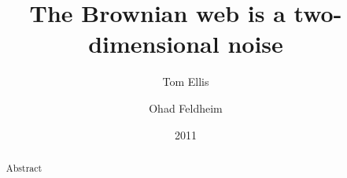 {
\title{The Brownian web is a two-dimensional noise}

\author{Tom Ellis\\%
\and Ohad Feldheim}

\date{2011}

\maketitle

\begin{abstract}
Abstract
\end{abstract}

}

